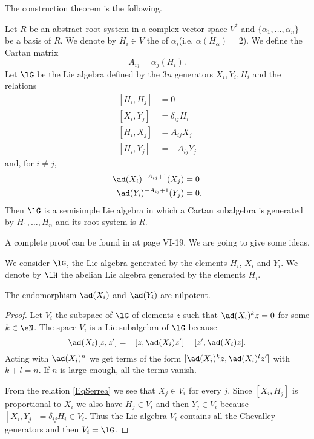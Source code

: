 The construction theorem is the following.
\begin{theorem}
    Let \( R\) be an abstract root system in a complex vector space \( V^*\) and \( \{ \alpha_1,\ldots,\alpha_n \}\) be a basis of \( R\). We denote by \( H_i\in V\) the  of \( \alpha_i\)(i.e. \( \alpha(H_{\alpha})=2\)). We define the Cartan matrix
    \begin{equation}
        A_{ij}=\alpha_j(H_i).
    \end{equation}
    Let \( \lG\) be the Lie algebra defined by the \( 3n\) generators \( X_i,Y_i,H_i\) and the relations
    \begin{subequations}
        \begin{align}
            [H_i,H_j]&=0\\
            [X_i,Y_j]&=\delta_{ij}H_i\\
            [H_i,X_j]&=A_{ij}X_j\\
            [H_i,Y_j]&=-A_{ij}Y_j
        \end{align}
    \end{subequations}
    and, for \( i\neq j\),
    \begin{subequations}
        \begin{align}
            \ad(X_i)^{-A_{ij}+1}(X_j)&=0        \label{EqSerrea}\\
            \ad(Y_i)^{-A_{ij}+1}(Y_j)&=0.
        \end{align}
    \end{subequations}
    Then \( \lG\) is a semisimple Lie algebra in which a Cartan subalgebra is generated by \( H_1,\ldots,H_n \) and its root system is \( R\).
\end{theorem}
A complete proof can be found in \cite{SerreSSAlgebres} at page VI-19. We are going to give some ideas.

We consider \( \lG\), the Lie algebra generated by the elements \( H_i\), \( X_i\) and \( Y_i\). We denote by \( \lH\) the abelian Lie algebra generated by the elements \( H_i\).
\begin{lemma}       \label{LemadXiNilpotent}
    The endomorphism \( \ad(X_i)\) and \( \ad(Y_i)\) are nilpotent.
\end{lemma}

\begin{proof}
    Let \( V_i\) the subspace of \( \lG\) of elements \( z\) such that \( \ad(X_i)^kz=0\) for some \( k\in\eN\). The space \( V_i\) is a Lie subalgebra of \( \lG\) because
    \begin{equation}
        \ad(X_i)[z,z']=-[z,\ad(X_i)z']+[z',\ad(X_i)z].
    \end{equation}
    Acting with \( \ad(X_i)^n\) we get terms of the form \( [\ad(X_i)^kz,\ad(X_i)^lz']\) with \( k+l=n\). If \( n\) is large enough, all the terms vanish.

    From the relation \eqref{EqSerrea} we see that \( X_j\in V_i\) for every \( j\). Since \( [X_i,H_j]\) is proportional to \( X_i\) we also have \( H_j\in V_i\) and then \( Y_j\in V_i\) because \( [X_i,Y_j]=\delta_{ij}H_i\in V_i\). Thus the Lie algebra \( V_i\) contains all the Chevalley generators and then \( V_i=\lG\).
\end{proof}

